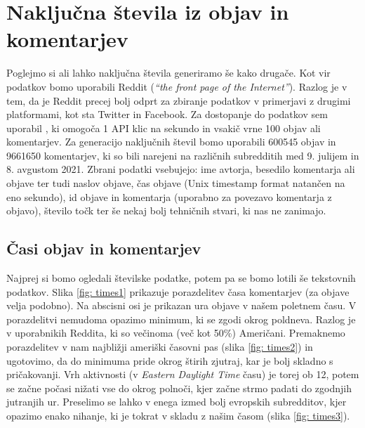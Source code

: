 \documentclass[11pt, oneside]{article}
\theoremstyle{definition}
\begin{document}
\section{Naključna števila iz objav in komentarjev}
Poglejmo si ali lahko naključna števila generiramo še kako drugače. Kot vir podatkov bomo uporabili
Reddit (\emph{“the front page of the Internet”}). Razlog je v tem, da je Reddit precej bolj odprt za
zbiranje podatkov v primerjavi z drugimi platformami, kot sta Twitter in Facebook.
Za dostopanje do podatkov sem uporabil \cite{baumgartner2020pushshift}, ki omogoča 1 API klic na sekundo in
vsakič vrne 100 objav ali komentarjev.
Za generacijo naključnih števil bomo uporabili 600545 objav in 9661650 komentarjev, ki so bili narejeni na
različnih subredditih med 9. julijem in 8. avgustom 2021. Zbrani podatki vsebujejo:
ime avtorja, besedilo komentarja ali objave ter tudi naslov objave, čas objave (Unix timestamp format
natančen na eno sekundo), id objave in komentarja (uporabno za povezavo komentarja z objavo), število točk ter še
nekaj bolj tehničnih stvari, ki nas ne zanimajo.

\subsection{Časi objav in komentarjev}
Najprej si bomo ogledali številske podatke, potem pa se bomo lotili še tekstovnih podatkov.
Slika \ref{fig: times1} prikazuje porazdelitev časa komentarjev (za objave velja podobno). Na abscisni osi je prikazan
ura objave v našem poletnem času. V porazdelitvi nemudoma opazimo minimum, ki se zgodi okrog poldneva.
Razlog je v uporabnikih Reddita, ki so večinoma (več kot 50\%) Američani.
Premaknemo porazdelitev v nam najbližji ameriški časovni pas (slika \ref{fig: times2}) in ugotovimo, da do minimuma pride
okrog štirih zjutraj, kar je bolj skladno s pričakovanji. Vrh aktivnosti (v \emph{Eastern Daylight Time} času)
je torej ob 12, potem se začne počasi nižati vse do okrog polnoči, kjer začne strmo padati do zgodnjih
jutranjih ur. Preselimo se lahko v enega izmed bolj evropskih subredditov, kjer opazimo enako nihanje, ki je tokrat
v skladu z našim časom (slika \ref{fig: times3}).
\end{document}
